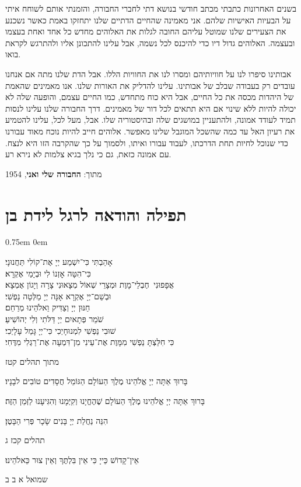 \documentclass[14pt, article, extrafontsizes, twopage, a4paper]{memoir}
\newcommand{\attr}[1]{
{\raggedright\smaller#1}
}
\begin{document}
בשנים האחרונות כתבתי מכתב חודשי בנושא דתי לחברי החבורה, והזמנתי אותם לשוחח איתי על הבעיות האישיות שלהם. אני מאמינה שהחיים הדתיים שלנו יתחזקו באמת כאשר נשכנע את הצעירים שלנו שמוטל עליהם החובה לגלות את האלוהים מחדש כל אחד ואחת בעצמו ובעצמה. האלוהים גדול דיו כדי להיכנס לכל נשמה, אבל עלינו להתכונן אליו ולהתרגש לקראת בואו.

אבותינו סיפרו לנו על חוויותיהם ומסרו לנו את החוויות הללו. אבל הדת שלנו מתה אם אנחנו עובדים רק בעבודה שבלב של אבותינו. עלינו להדליק את האורות שלנו. אנו מאמינים שהאמת של היהדות מכסה את כל החיים, אבל היא כוח מתחדש, כמו החיים עצמם, והופעה שלה לא יכולה להיות ללא שינוי אם היא תתאים לכל דור של מאמינים. דרך החבורה שלנו עלינו לנסות תמיד לעודד אמונה, ולהתעניין במושגים שלה ובהיסטוריה שלו. אבל, מעל לכל, עלינו להטמיע את רעיון האל עד כמה שהשכל המוגבל שלינו מאפשר. אלוהים חייב להיות נוכח מאוד עבורנו כדי שנוכל לחיות תחת הדרכתו, לעבוד עבורו ואיתו, ולסמוך על כך שהקרבה הזו היא לנצח. עם אמונה כזאת, גם כי נלך בגיא צלמות לא נירא רע.

\attr{מתוך: \textbf{החבורה שלי ואני}, 1954}


\pagebreak
\chapter{תפילה והודאה לרגל לידת בן}
\parskip 0.75em
\parindent 0em


אָהַבְתִּי כִּי־יִשְׁמַע יְיָ אֶת־קוֹלִי תַּחֲנוּנָי׃\\
כִּי־הִטָּה אׇזְנוֹ לִי וּבְיָמַי אֶקְרָא׃\\
אֲפָפוּנִי  חֶבְלֵי־מָוֶת וּמְצָרֵי שְׁאוֹל מְצָאוּנִי צָרָה וְיָגוֹן אֶמְצָא׃\\
וּבְשֵׁם־יְיָ אֶקְרָא אָנָּה יְיָ מַלְּטָה נַפְשִׁי׃\\
חַנּוּן יְיָ וְצַדִּיק וֵאלֹהֵינוּ מְרַחֵם׃\\
שֹׁמֵר פְּתָאיִם יְיָ דַּלֹּתִי וְלִי יְהוֹשִׁיעַ׃\\
שׁוּבִי נַפְשִׁי לִמְנוּחָיְכִי כִּי־יְיָ גָּמַל עָלָיְכִי׃\\
כִּי חִלַּצְתָּ נַפְשִׁי מִמָּוֶת אֶת־עֵינִי מִן־דִּמְעָה אֶת־רַגְלִי מִדֶּחִי׃
\attr{מתוך תהלים קטז}

בָּרוּךְ אַתָּה יְיָ אֱלֹהֵינוּ מֶלֶךְ הַעוֹלָם הַגּוֹמֵל חֲסָדִים טוֹבִים לבָנָיו׃

בָּרוּךְ אַתָּה יְיָ אֱלֹהֵינוּ מֶלֶךְ הַעוֹלָם שֶׁהֶחֱיָנוּ וְקִיְּמָנוּ וְהִגִּיעָנוּ לַזְּמַן הַזֶּה׃

הִנֵּה נַחֲלַת יְיָ בָּנִים שָׂכָר פְּרִי הַבָּטֶן׃
\attr{תהלים קכז ג}

אֵין־קָדוֹשׁ כַּייָ כִּי אֵין בִּלְתֶּךָ וְאֵין צוּר כֵּאלֹהֵינוּ׃
\attr{שמואל א ב ב}
\end{document}
